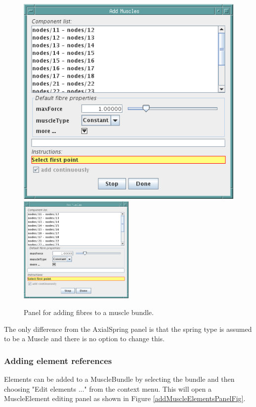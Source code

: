 \documentclass{article}
\begin{document}
\begin{figure}
\begin{center}
\iflatexml
\includegraphics[]{images/addMuscleFibresPanel}
\else
\includegraphics[width=0.50\textwidth]{images/addMuscleFibresPanel}
\fi
\end{center}
\caption{Panel for adding fibres to a muscle bundle.}%
\label{addMuscleFibresPanelFig}
\end{figure}

The only difference from the AxialSpring panel is that the spring type
is assumed to be a Muscle and there is no option to change this.

\subsubsection{Adding element references}

Elements can be added to a MuscleBundle by selecting the bundle and then
choosing {\sf "Edit elements ..."} from the context menu. This will open a
MuscleElement editing panel as shown in Figure \ref{addMuscleElementsPanelFig}.
\end{document}
